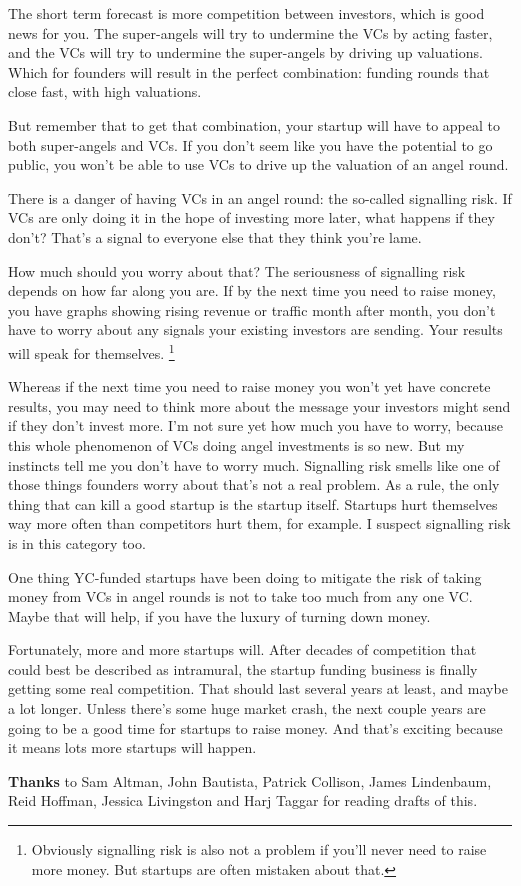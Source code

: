 The short term forecast is more competition between investors, which is
good news for you. The super-angels will try to undermine the VCs by
acting faster, and the VCs will try to undermine the super-angels by
driving up valuations. Which for founders will result in the perfect
combination: funding rounds that close fast, with high valuations.

But remember that to get that combination, your startup will have to
appeal to both super-angels and VCs. If you don't seem like you have the
potential to go public, you won't be able to use VCs to drive up the
valuation of an angel round.

There is a danger of having VCs in an angel round: the so-called
signalling risk. If VCs are only doing it in the hope of investing more
later, what happens if they don't? That's a signal to everyone else that
they think you're lame.

How much should you worry about that? The seriousness of signalling risk
depends on how far along you are. If by the next time you need to raise
money, you have graphs showing rising revenue or traffic month after
month, you don't have to worry about any signals your existing investors
are sending. Your results will speak for themselves.
\footnote{Obviously signalling risk is also not a problem if you'll never
need to raise more money. But startups are often mistaken about that.}

Whereas if the next time you need to raise money you won't yet have
concrete results, you may need to think more about the message your
investors might send if they don't invest more. I'm not sure yet how
much you have to worry, because this whole phenomenon of VCs doing angel
investments is so new. But my instincts tell me you don't have to worry
much. Signalling risk smells like one of those things founders worry
about that's not a real problem. As a rule, the only thing that can kill
a good startup is the startup itself. Startups hurt themselves way more
often than competitors hurt them, for example. I suspect signalling risk
is in this category too.

One thing YC-funded startups have been doing to mitigate the risk of
taking money from VCs in angel rounds is not to take too much from any
one VC. Maybe that will help, if you have the luxury of turning down
money.

Fortunately, more and more startups will. After decades of competition
that could best be described as intramural, the startup funding business
is finally getting some real competition. That should last several years
at least, and maybe a lot longer. Unless there's some huge market crash,
the next couple years are going to be a good time for startups to raise
money. And that's exciting because it means lots more startups will
happen.


\textbf{Thanks} to Sam Altman, John Bautista, Patrick Collison, James
Lindenbaum, Reid Hoffman, Jessica Livingston and Harj Taggar for reading
drafts of this.